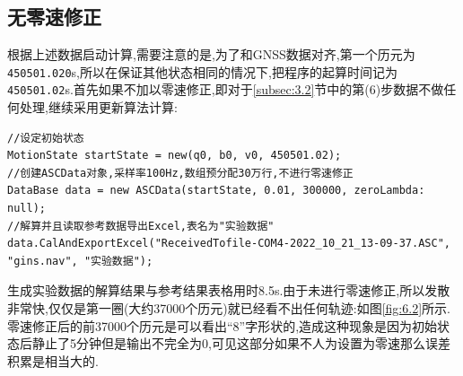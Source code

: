 \documentclass[10pt,a4paper]{ctexart}
\begin{document}
\subsection{无零速修正}
根据上述数据启动计算,需要注意的是,为了和\textsf{GNSS}数据对齐,第一个历元为\texttt{450501.020}s,所以在保证其他状态相同的情况下,把程序的起算时间记为\texttt{450501.02}s.首先如果不加以零速修正,即对于\ref{subsec:3.2}节中的第(6)步数据不做任何处理,继续采用更新算法计算:
\begin{lstlisting}
//设定初始状态
MotionState startState = new(q0, b0, v0, 450501.02);
//创建ASCData对象,采样率100Hz,数组预分配30万行,不进行零速修正
DataBase data = new ASCData(startState, 0.01, 300000, zeroLambda: null);
//解算并且读取参考数据导出Excel,表名为"实验数据"
data.CalAndExportExcel("ReceivedTofile-COM4-2022_10_21_13-09-37.ASC", "gins.nav", "实验数据");
\end{lstlisting}
生成实验数据的解算结果与参考结果表格用时8.5s.由于未进行零速修正,所以发散非常快,仅仅是第一圈(大约37000个历元)就已经看不出任何轨迹:如图\ref{fig:6.2}所示.零速修正后的前37000个历元是可以看出``8''字形状的,造成这种现象是因为初始状态后静止了5分钟但是\IMU 输出不完全为0,可见这部分如果不人为设置为零速那么误差积累是相当大的.
\end{document}
